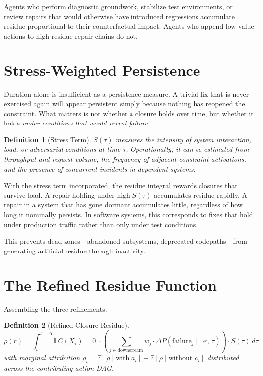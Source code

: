 \documentclass[12pt]{article}
\newtheorem{definition}{Definition}
\begin{document}
Agents who perform diagnostic groundwork, stabilize test environments,
or review repairs that would otherwise have introduced regressions
accumulate residue proportional to their counterfactual impact.
Agents who append low-value actions to high-residue repair chains do
not.

\section{Stress-Weighted Persistence}

Duration alone is insufficient as a persistence measure. A trivial fix
that is never exercised again will appear persistent simply because
nothing has reopened the constraint. What matters is not whether a
closure holds over time, but whether it holds \emph{under conditions
that would reveal failure}.

\begin{definition}[Stress Term]
$S(\tau)$ measures the intensity of system interaction, load, or
adversarial conditions at time $\tau$. Operationally, it can be
estimated from throughput and request volume, the frequency of adjacent
constraint activations, and the presence of concurrent incidents in
dependent systems.
\end{definition}

With the stress term incorporated, the residue integral rewards closures
that survive load. A repair holding under high $S(\tau)$ accumulates
residue rapidly. A repair in a system that has gone dormant accumulates
little, regardless of how long it nominally persists. In software
systems, this corresponds to fixes that hold under production traffic
rather than only under test conditions.

This prevents dead zones---abandoned subsystems, deprecated
codepaths---from generating artificial residue through inactivity.

\section{The Refined Residue Function}

Assembling the three refinements:

\begin{definition}[Refined Closure Residue]
\[
  \rho(r) = \int_{t}^{t+\Delta}
    \mathbb{I}\bigl[C(X_\tau) = 0\bigr]
    \cdot
    \left(
      \sum_{j \in \mathrm{downstream}}
        w_j \cdot \Delta P\!\left(\mathrm{failure}_j \mid \neg r,\, \tau\right)
    \right)
    \cdot S(\tau)
  \, d\tau
\]
with marginal attribution $\rho_i =
\mathbb{E}[\rho \mid \text{with } a_i] -
\mathbb{E}[\rho \mid \text{without } a_i]$
distributed across the contributing action DAG.
\end{definition}
\end{document}
